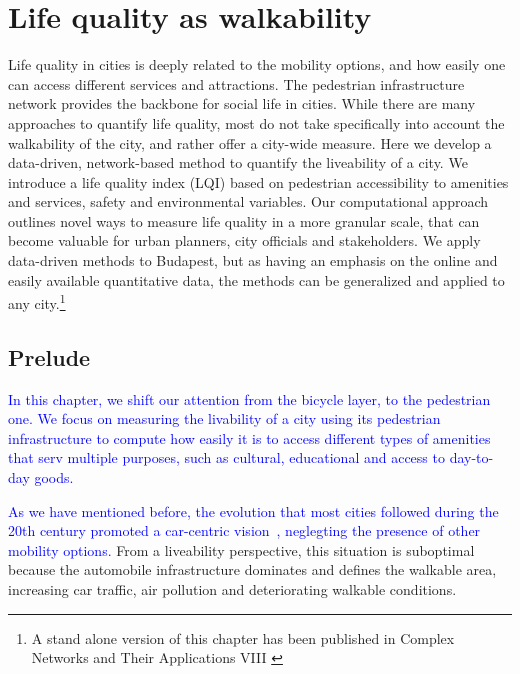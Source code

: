 \chapter{Life quality as walkability}

Life quality in cities is deeply related to the mobility options, and how easily one can access different services and attractions. The pedestrian infrastructure network provides the backbone for social life in cities. While there are many approaches to quantify life quality, most do not take specifically into account the walkability of the city, and rather offer a city-wide measure. Here we develop a data-driven, network-based method to quantify the liveability of a city. We introduce a life quality index (LQI) based on pedestrian accessibility to amenities and services, safety and environmental variables. Our computational approach outlines novel ways to measure life quality in a more granular scale, that can become valuable for urban planners, city officials and stakeholders. We apply data-driven methods to Budapest, but as having an emphasis on the online and easily available quantitative data, the methods can be generalized and applied to any city.\footnote{A stand alone version of this chapter has been published in Complex Networks and Their Applications VIII \cite{natera2020walkability}}
\pagebreak

\section{Prelude}
\textcolor{blue}{In this chapter, we shift our attention from the bicycle layer, to the pedestrian one. We focus on measuring the livability of a city using its pedestrian infrastructure to compute how easily it is to access different types of amenities that serv multiple purposes, such as cultural, educational and access to day-to-day goods.}

\textcolor{blue}{As we have mentioned before, the evolution that most cities followed during the 20th century promoted a car-centric vision~\cite{Jacobs1961Death,Gossling2016Space,Szell2018Crowdsourced}, neglegting the presence of other mobility options.} From a liveability perspective, this situation is suboptimal because the automobile infrastructure dominates and defines the walkable area, increasing car traffic, air pollution and deteriorating walkable conditions.

